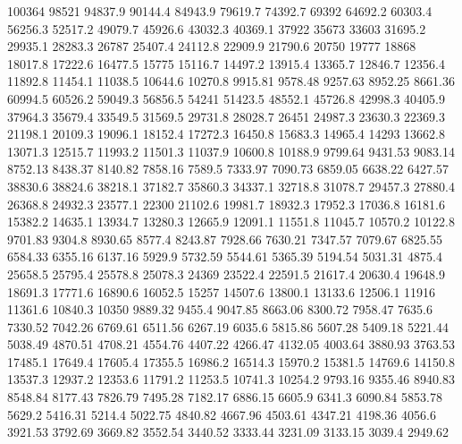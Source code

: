 100364      98521      94837.9      90144.4      84943.9      79619.7      74392.7      69392      64692.2      60303.4      56256.3      52517.2      49079.7      45926.6      43032.3      40369.1      37922      35673      33603      31695.2      29935.1      28283.3      26787      25407.4      24112.8      22909.9      21790.6      20750      19777      18868      18017.8      17222.6      16477.5      15775      15116.7      14497.2      13915.4      13365.7      12846.7      12356.4      11892.8      11454.1      11038.5      10644.6      10270.8      9915.81      9578.48      9257.63      8952.25      8661.36      
60994.5      60526.2      59049.3      56856.5      54241      51423.5      48552.1      45726.8      42998.3      40405.9      37964.3      35679.4      33549.5      31569.5      29731.8      28028.7      26451      24987.3      23630.3      22369.3      21198.1      20109.3      19096.1      18152.4      17272.3      16450.8      15683.3      14965.4      14293      13662.8      13071.3      12515.7      11993.2      11501.3      11037.9      10600.8      10188.9      9799.64      9431.53      9083.14      8752.13      8438.37      8140.82      7858.16      7589.5      7333.97      7090.73      6859.05      6638.22      6427.57      
38830.6      38824.6      38218.1      37182.7      35860.3      34337.1      32718.8      31078.7      29457.3      27880.4      26368.8      24932.3      23577.1      22300      21102.6      19981.7      18932.3      17952.3      17036.8      16181.6      15382.2      14635.1      13934.7      13280.3      12665.9      12091.1      11551.8      11045.7      10570.2      10122.8      9701.83      9304.8      8930.65      8577.4      8243.87      7928.66      7630.21      7347.57      7079.67      6825.55      6584.33      6355.16      6137.16      5929.9      5732.59      5544.61      5365.39      5194.54      5031.31      4875.4      
25658.5      25795.4      25578.8      25078.3      24369      23522.4      22591.5      21617.4      20630.4      19648.9      18691.3      17771.6      16890.6      16052.5      15257      14507.6      13800.1      13133.6      12506.1      11916      11361.6      10840.3      10350      9889.32      9455.4      9047.85      8663.06      8300.72      7958.47      7635.6      7330.52      7042.26      6769.61      6511.56      6267.19      6035.6      5815.86      5607.28      5409.18      5221.44      5038.49      4870.51      4708.21      4554.76      4407.22      4266.47      4132.05      4003.64      3880.93      3763.53      
17485.1      17649.4      17605.4      17355.5      16986.2      16514.3      15970.2      15381.5      14769.6      14150.8      13537.3      12937.2      12353.6      11791.2      11253.5      10741.3      10254.2      9793.16      9355.46      8940.83      8548.84      8177.43      7826.79      7495.28      7182.17      6886.15      6605.9      6341.3      6090.84      5853.78      5629.2      5416.31      5214.4      5022.75      4840.82      4667.96      4503.61      4347.21      4198.36      4056.6      3921.53      3792.69      3669.82      3552.54      3440.52      3333.44      3231.09      3133.15      3039.4      2949.62      
